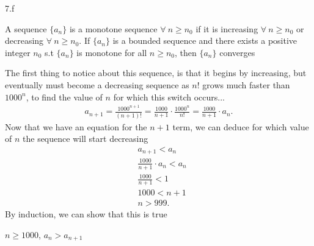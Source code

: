 \documentclass{report}
\begin{document}
    \pagebreak \bigbreak \noindent 
    7.f
    \bigbreak \noindent 
    \begin{remark}
        A sequence $\{a_{n}\} $ is a monotone sequence $\forall\ n \geq n_{0}$ if it is increasing $\forall\ n \geq n_{0}$ or decreasing $\forall\ n \geq n_{0}$. If $\{a_{n}\}$ is a bounded sequence  and there exists a positive integer $n_{0}$ s.t $\{a_{n}\} $ is monotone for all $n \geq n_{0}$, then $\{a_{n}\} $ converges
    \end{remark}
    \bigbreak \noindent 
    The first thing to notice about this sequence, is that it begins by increasing, but eventually must become a decreasing sequence as $n!$ grows much faster than $1000^{n}$, to find the value of $n$ for which this switch occurs...
    \bigbreak \noindent 
    \begin{align*}
        a_{n+1} = \frac{1000^{n+1}}{(n+1)!} = \frac{1000}{n+1} \cdot  \frac{1000^{n}}{n!} = \frac{1000}{n+1}\cdot a_{n}
    .\end{align*}
    \bigbreak \noindent 
    Now that we have an equation for the $n+1$ term, we can deduce for which value of $n$ the sequence will start decreasing
    \begin{align*}
        &a_{n+1} < a_{n} \\
        & \frac{1000}{n+1} \cdot a_{n} < a_{n} \\
        &\frac{1000}{n+1} < 1 \\
        &1000 < n+1 \\
        & n > 999
    .\end{align*}
    \bigbreak \noindent 
    By induction, we can show that this is true
    \bigbreak \noindent 
    \begin{prop}
       \forall $n \geq 1000$, $a_{n} > a_{n+1} $ 
    \end{prop}
    
\end{document}
